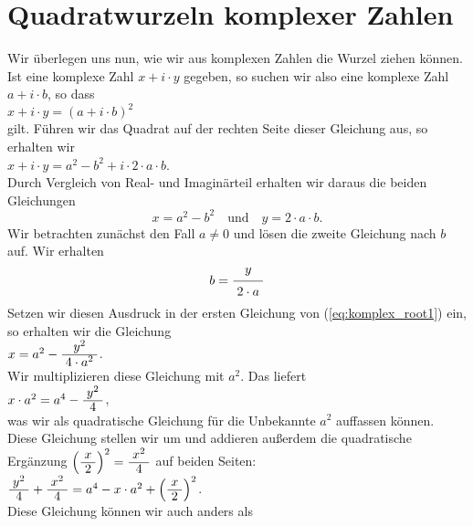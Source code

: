 \section{Quadratwurzeln komplexer Zahlen}
Wir überlegen uns nun, wie wir aus komplexen Zahlen die Wurzel ziehen können.  Ist eine komplexe Zahl
$x + i \cdot y$ gegeben, so suchen wir also eine komplexe Zahl $a + i \cdot b$, so dass
\\[0.2cm]
\hspace*{1.3cm}
$x + i \cdot y = (a + i \cdot b)^2$
\\[0.2cm]
gilt.  Führen wir das Quadrat auf der rechten Seite dieser Gleichung aus, so erhalten wir
\\[0.2cm]
\hspace*{1.3cm}
$x + i \cdot y = a^2 - b^2 + i \cdot 2 \cdot a \cdot b$.
\\[0.2cm]
Durch Vergleich von Real- und Imaginärteil erhalten wir daraus die beiden Gleichungen
\begin{equation}
  \label{eq:komplex_root1}
  x = a^2 - b^2 \quad \mbox{und} \quad y = 2 \cdot a \cdot b.
\end{equation}
Wir betrachten zunächst den Fall $a \not= 0$ und
lösen die zweite Gleichung nach $b$ auf.  Wir erhalten
\begin{equation}
  \label{eq:komplex_root2}
  b = \bruch{y}{2 \cdot a}  
\end{equation}
Setzen wir diesen Ausdruck in der ersten Gleichung von (\ref{eq:komplex_root1}) ein, so erhalten wir die
Gleichung 
\\[0.2cm]
\hspace*{1.3cm}
$x = a^2 - \bruch{y^2}{4 \cdot a^2}$.
\\[0.2cm]
Wir multiplizieren diese Gleichung mit $a^2$. Das liefert 
\\[0.2cm]
\hspace*{1.3cm}
$x \cdot a^2 = a^4 - \bruch{y^2}{4}$,
\\[0.2cm] 
was wir als quadratische Gleichung für die  Unbekannte $a^2$ auffassen können.
 Diese Gleichung stellen wir um und addieren außerdem die quadratische Ergänzung 
$\left(\bruch{x}{2}\right)^2 = \bruch{x^2}{4}$ auf 
beiden Seiten: 
\\[0.2cm]
\hspace*{1.3cm}
$\bruch{y^2}{4} + \bruch{x^2}{4} = a^4 - x \cdot a^2 + \left(\bruch{x}{2}\right)^2$.
\\[0.2cm]
Diese Gleichung können wir auch anders als
\\[0.2cm]
\hspace*{1.3cm}
